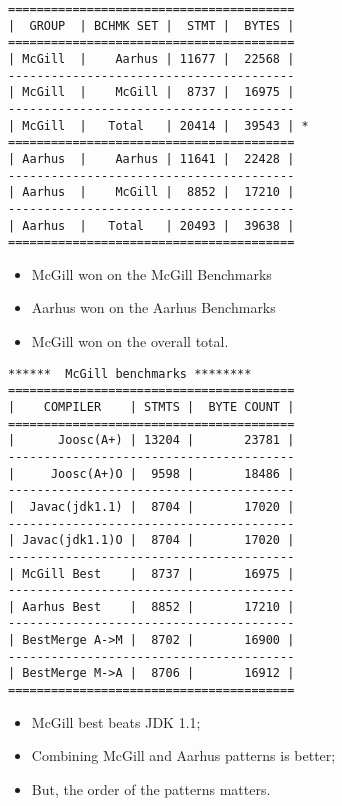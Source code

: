 \documentclass[a4,portrait]{seminar}
\begin{document}
\begin{slide*}
\begin{small}
\begin{verbatim}
========================================
|  GROUP  | BCHMK SET |  STMT |  BYTES |
========================================
| McGill  |    Aarhus | 11677 |  22568 |
----------------------------------------
| McGill  |    McGill |  8737 |  16975 |
----------------------------------------
| McGill  |   Total   | 20414 |  39543 | *
========================================
| Aarhus  |    Aarhus | 11641 |  22428 |
----------------------------------------
| Aarhus  |    McGill |  8852 |  17210 |
----------------------------------------
| Aarhus  |   Total   | 20493 |  39638 |
========================================
\end{verbatim}
\end{small}
\end{slide*}

\begin{slide*}

\begin{itemize}
\item 
McGill won on the McGill Benchmarks
\item
Aarhus won on the Aarhus Benchmarks
\item
McGill won on the overall total.
\end{itemize}
\end{slide*}

\begin{slide*}
\begin{small}
\begin{verbatim}
******  McGill benchmarks ********
========================================
|    COMPILER    | STMTS |  BYTE COUNT |
========================================
|      Joosc(A+) | 13204 |       23781 |
----------------------------------------
|     Joosc(A+)O |  9598 |       18486 |
----------------------------------------
|  Javac(jdk1.1) |  8704 |       17020 |
----------------------------------------
| Javac(jdk1.1)O |  8704 |       17020 |
----------------------------------------
| McGill Best    |  8737 |       16975 |
----------------------------------------
| Aarhus Best    |  8852 |       17210 |
----------------------------------------
| BestMerge A->M |  8702 |       16900 |
----------------------------------------
| BestMerge M->A |  8706 |       16912 |
========================================
\end{verbatim}
\end{small}
\end{slide*}

\begin{slide*}
\end{slide*}

\begin{slide*}
\begin{itemize}
\item McGill best beats JDK 1.1;
\item Combining McGill and Aarhus patterns is better;
\item But, the order of the patterns matters.
\end{itemize}
\end{slide*}
\end{document}
